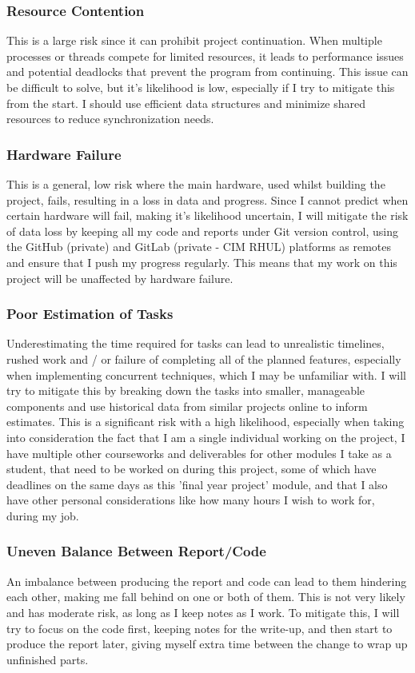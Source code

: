 \documentclass[]{project_plan}
\begin{document}
\subsubsection{Resource Contention}
This is a large risk since it can prohibit project continuation. When multiple processes
or threads compete for limited resources, it leads to performance issues and potential
deadlocks that prevent the program from continuing. This issue can be difficult to solve,
but it's likelihood is low, especially if I try to mitigate this from the start. I should use
efficient data structures and minimize shared resources to reduce synchronization needs.

\subsubsection{Hardware Failure}
This is a general, low risk where the main hardware, used whilst building the project, fails,
resulting in a loss in data and progress. Since I cannot predict when certain hardware will fail, making
it's likelihood uncertain, I will mitigate the risk of data loss by keeping all my code and reports
under Git version control, using the GitHub (private) and GitLab (private - CIM RHUL) platforms as
remotes and ensure that I push my progress regularly. This means that my work on this project will
be unaffected by hardware failure.

\subsubsection{Poor Estimation of Tasks}
Underestimating the time required for tasks can lead to unrealistic timelines, rushed work and / or failure of
completing all of the planned features, especially when implementing concurrent techniques, which I may
be unfamiliar with. I will try to mitigate this by breaking down the tasks into smaller, manageable components
and use historical data from similar projects online to inform estimates. This is a significant risk with
a high likelihood, especially when taking into consideration the fact that I am a single individual working
on the project, I have multiple other courseworks and deliverables for other modules I take as a student,
that need to be worked on during this project, some of which have deadlines on the same days as this
'final year project' module, and that I also have other personal considerations like how many hours
I wish to work for, during my job.

\subsubsection{Uneven Balance Between Report/Code}
An imbalance between producing the report and code can lead to them hindering each other, making me fall behind
on one or both of them. This is not very likely and has moderate risk, as long as I keep notes as I work. To
mitigate this, I will try to focus on the code first, keeping notes for the write-up, and then start to produce
the report later, giving myself extra time between the change to wrap up unfinished parts.
\end{document}
